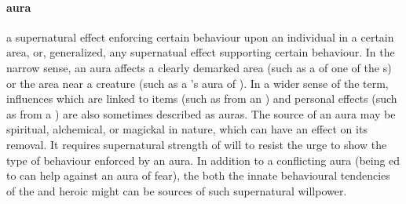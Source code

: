 \paragraph{aura} a supernatural effect enforcing certain behaviour upon an individual in a certain area, or, generalized, any supernatual effect supporting certain behaviour. In the narrow sense, an aura affects a clearly demarked area (such as a  of one of the s) or the area near a creature (such as a 's aura of ). In a wider sense of the term, influences which are linked to items (such as from an ) and personal effects (such as from a ) are also sometimes described as auras. The source of an aura may be spiritual, alchemical, or magickal in nature, which can have an effect on its removal. \localpar It requires supernatural strength of will to resist the urge to show the type of behaviour enforced by an aura. In addition to a conflicting aura (being ed to  can help against an aura of fear), the both the innate behavioural tendencies of the  and heroic might can be sources of such supernatural willpower.
